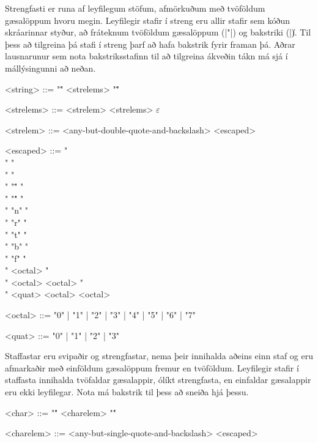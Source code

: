 \documentclass[12pt]{article}
\makeatletter
\newenvironment{bnf}[2]{%
    \setlength{\grammarindent}{\widthof{\synt{#2}::=} + 0.85em}
    \def\@grammarname{#1}
    \begin{grammarfloat}[H]
    \begin{mdframed}[style=langframe]
    \vspace{-\grammarparsep}
    \begin{grammar}
}{%
    \end{grammar}
    \end{mdframed}
    \vspace{-10pt}
    \caption{\@grammarname}
    \end{grammarfloat}
    \setlength{\grammarindent}{2em}
}
\renewcommand*{\empty}{\ensuremath{\varepsilon}}
\makeatother
\begin{document}
Strengfasti er runa af leyfilegum stöfum, afmörkuðum með tvöföldum gæsalöppum hvoru megin.
Leyfilegir stafir í streng eru allir stafir sem kóðun skráarinnar styður, að fráteknum
tvöföldum gæsalöppum (|"|) og bakstriki (|\|). Til þess að tilgreina þá stafi í streng þarf að
hafa bakstrik fyrir framan þá.
Aðrar lausnarunur sem nota bakstriksstafinn til að tilgreina ákveðin tákn
má sjá í mállýsingunni að neðan.

\begin{bnf}{Strengfastar}{strelems}
    <string> ::= "\"" <strelems> "\""

    <strelems> ::= <strelem> <strelems>
              \alt \empty

    <strelem> ::= <any-but-double-quote-and-backslash>
             \alt <escaped>

    <escaped> ::= "\\" "\\"
             \alt "\\" "\""
             \alt "\\" "\'"
             \alt "\\" "n"
             \alt "\\" "r"
             \alt "\\" "t"
             \alt "\\" "b"
             \alt "\\" "f"
             \alt "\\" <octal>
             \alt "\\" <octal> <octal>
             \alt "\\" <quat> <octal> <octal>

    <octal> ::= "0" | "1" | "2" | "3" | "4" | "5" | "6" | "7"

    <quat> ::= "0" | "1" | "2" | "3"
\end{bnf}

Staffastar eru svipaðir og strengfastar, nema þeir innihalda aðeins einn staf
og eru afmarkaðir með einföldum gæsalöppum fremur en tvöföldum.
Leyfilegir stafir í staf\-fasta innihalda tvöfaldar gæsalappir, ólíkt strengfasta,
en einfaldar gæsalappir eru ekki leyfilegar.
Nota má bakstrik til þess að sneiða hjá þessu.

\begin{bnf}{Staffastar}{charelem}
    <char> ::= "\'" <charelem> "\'"

    <charelem> ::= <any-but-single-quote-and-backslash>
              \alt <escaped>
\end{bnf}
\end{document}
